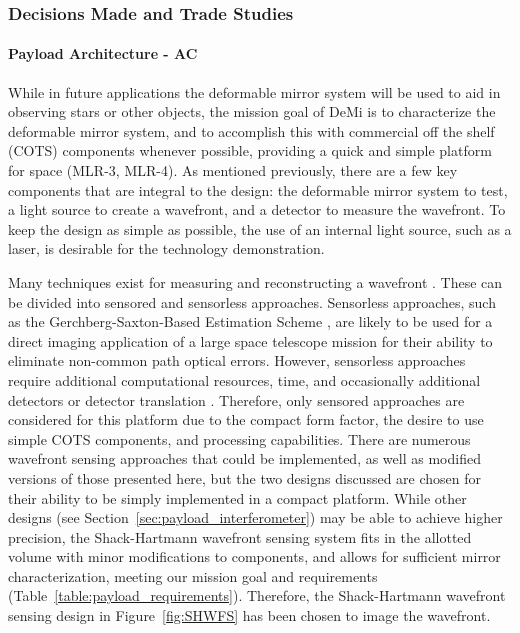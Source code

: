\documentclass[12pt]{article}
\begin{document}
			\subsubsection{Decisions Made and Trade Studies}

\paragraph{Payload Architecture - AC}

While in future applications the deformable mirror system will be used to aid
in observing stars or other objects, the mission goal of DeMi is to characterize the deformable 
mirror system, and to accomplish this with commercial off the shelf (COTS) components
whenever possible, providing a quick and simple platform for space (MLR-3, MLR-4).
As mentioned previously, there are a few key components that are integral to the design: the 
deformable mirror system to test, a light source to create a wavefront, and a detector to measure the wavefront.
To keep the design as simple as possible, the use of an internal light source, such as a laser, is  desirable for the technology demonstration. 

Many techniques exist for measuring and reconstructing a wavefront \cite{FGadaptiveoptics}.  These can be divided into sensored and sensorless approaches.
Sensorless approaches, such as the Gerchberg-Saxton-Based Estimation Scheme \cite{gerchberg}, are likely to be used for a direct imaging application of a large space telescope mission for their ability to eliminate non-common path optical errors.  However, sensorless approaches require additional computational resources, time, and occasionally additional detectors or detector translation \cite{cahoy2013}.  
Therefore, only sensored
approaches are considered for this platform due to the compact form
factor, the desire to use simple COTS components, and processing capabilities. There are numerous wavefront
sensing approaches that could be implemented, as well as
modified versions of those presented here, but the two designs discussed are chosen for their ability to be simply implemented in a compact platform.
While other designs (see Section~\ref{sec:payload_interferometer}) may be able to achieve higher precision, the Shack-Hartmann wavefront sensing system fits in the allotted volume with minor modifications to components, and allows for sufficient mirror characterization, meeting our mission goal and requirements (Table~\ref{table:payload_requirements}). Therefore, the Shack-Hartmann wavefront sensing design in Figure~\ref{fig:SHWFS} has been chosen to image the wavefront.
\end{document}
